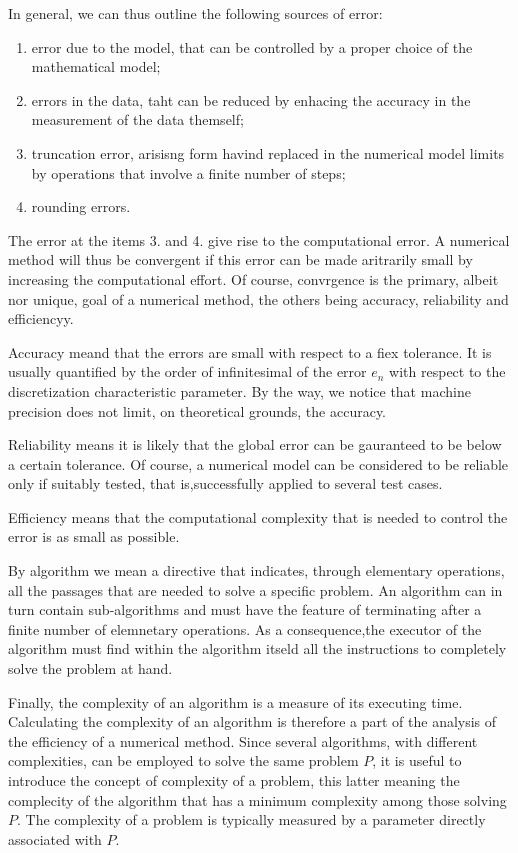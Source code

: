 In general, we can thus outline the following sources of error:
\begin{enumerate}
    \item error due to the model, that can be controlled by a proper choice of the mathematical model;
    \item errors in the data, taht can be reduced by enhacing the accuracy in the measurement of the data themself;
    \item truncation error, arisisng form havind replaced in the numerical model limits by operations that involve a finite number of steps;
    \item rounding errors.
\end{enumerate}

The error at the items 3. and 4. give rise to the computational error. A numerical method will thus be convergent if this error can be made aritrarily small by increasing the computational effort. Of course, convrgence is the primary, albeit nor unique, goal of a numerical method, the others being accuracy, reliability and efficiencyy.

Accuracy meand that the errors are small with respect to a fiex tolerance. It is usually quantified by the order of infinitesimal of the error $e_n$ with respect to the discretization characteristic parameter. By the way, we notice that machine precision does not limit, on theoretical grounds, the accuracy.

Reliability means it is likely that the global error can be gauranteed to be below a certain tolerance. Of course, a numerical model can be considered to be reliable only if suitably tested, that is,successfully applied to several test cases.

Efficiency means that the computational complexity that is needed to control the error is as small as possible.

By algorithm we mean a directive that indicates, through elementary operations, all the passages that are needed to solve a specific problem. An algorithm can in turn contain sub-algorithms and must have the feature of terminating after a finite number of elemnetary operations. As a consequence,the executor of the algorithm must find within the algorithm itseld all the instructions to completely solve the problem at hand.

Finally, the complexity of an algorithm is a measure of its executing time. Calculating the complexity of an algorithm is therefore a part of the analysis of the efficiency of a numerical method. Since several algorithms, with different complexities, can be employed to solve the same problem $P$, it is useful to introduce the concept of complexity of a problem, this latter meaning the complecity of the algorithm that has a minimum complexity among those solving $P$. The complexity of a problem is typically measured by a parameter directly associated with $P$.

